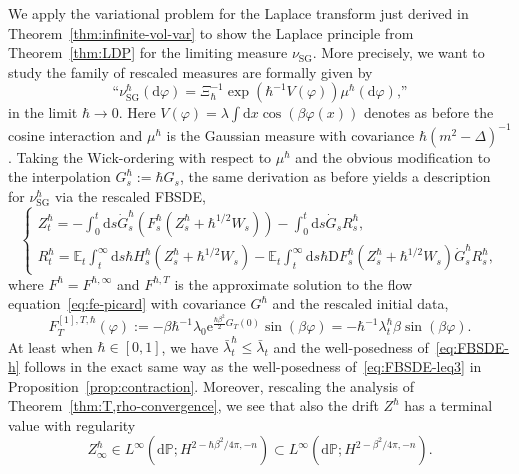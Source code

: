 \documentclass[11pt, a4paper]{scrartcl}
\numberwithin{equation}{section}
\theoremstyle{plain}
\theoremstyle{remark}
\newcommand{\assign}{:=}
\newcommand{\mathD}{\mathrm{D}}
\newcommand{\mathd}{\mathrm{d}}
\newcommand{\mathe}{\mathrm{e}}
\newcommand{\tmop}[1]{\ensuremath{\operatorname{#1}}}
\begin{document}
We apply the variational problem for the Laplace transform just derived in
Theorem~\ref{thm:infinite-vol-var} to show the Laplace principle from
Theorem~\ref{thm:LDP} for the limiting measure $\nu_{\tmop{SG}}$. More
precisely, we want to study the family of rescaled measures are formally given
by
\begin{equation}
  \text{``}\nu_{\tmop{SG}}^{\hbar} (\mathd \varphi) = \Xi_{\hbar}^{- 1} \exp
  (\hbar^{- 1} V (\varphi)) \mu^{\hbar} (\mathd \varphi)\text{,''}
  \label{eq:def-SGh}
\end{equation}
in the limit $\hbar \rightarrow 0$. Here $V (\varphi) = \lambda \int \mathd x
\cos (\beta \varphi (x))$ denotes as before the cosine interaction and
$\mu^{\hbar}$ is the Gaussian measure with covariance $\hbar (m^2 - \Delta)^{-
1}$. Taking the Wick-ordering with respect to $\mu^{\hbar}$ and the obvious
modification to the interpolation $G_s^{\hbar} \assign \hbar G_s$, the same
derivation as before yields a description for $\nu_{\tmop{SG}}^{\hbar}$ via
the rescaled FBSDE,
\begin{equation}
  \begin{cases}
    Z^{\hbar}_t = - \int_0^t \mathd s \dot{G}_s^{\hbar} (F^{\hbar}_s
    (Z^{\hbar}_s + \hbar^{1 / 2} W_s)) - \int_0^t \mathd s \dot{G}_s
    R^{\hbar}_s,\\
    R^{\hbar}_t =\mathbb{E}_t \int_t^{\infty} \mathd s \hbar H^{\hbar}_s
    (Z^{\hbar}_s + \hbar^{1 / 2} W_s) -\mathbb{E}_t \int_t^{\infty} \mathd s
    \hbar \mathD F^{\hbar}_s (Z^{\hbar}_s + \hbar^{1 / 2} W_s) 
    \dot{G}^{\hbar}_s R^{\hbar}_s,
  \end{cases} \label{eq:FBSDE-h}
\end{equation}
where $F^{\hbar} = F^{\hbar, \infty}$ and $F^{\hbar, T}$ is the approximate
solution to the flow equation~\eqref{eq:fe-picard} with covariance $G^{\hbar}$
and the rescaled initial data,
\[ F_T^{[1], T, \hbar} (\varphi) \assign - \beta \hbar^{- 1} \lambda_0
   \mathe^{\frac{\hbar \beta^2}{2} G_T (0)} \sin (\beta \varphi) = - \hbar^{-
   1} \lambda_t^{\hbar} \beta \sin (\beta \varphi) . \]
At least when $\hbar \in [0, 1]$, we have $\bar{\lambda}^{\hbar}_t \leqslant
\bar{\lambda}_t$ and the well-posedness of~\eqref{eq:FBSDE-h} follows in the exact
same way as the well-posedness of~\eqref{eq:FBSDE-leq3} in
Proposition~\ref{prop:contraction}. Moreover, rescaling the analysis of
Theorem~\ref{thm:T,rho-convergence}, we see that also the drift $Z^{\hbar}$
has a terminal value with regularity
\begin{equation}
  Z^{\hbar}_{\infty} \in L^{\infty} (\mathd \mathbb{P} ; H^{2 - \hbar \beta^2 / 4 \pi,
  - n}) \subset L^{\infty} (\mathd \mathbb{P} ; H^{2 - \beta^2 / 4 \pi, - n}) .
  \label{eq:Zh-infty}
\end{equation}
\end{document}
